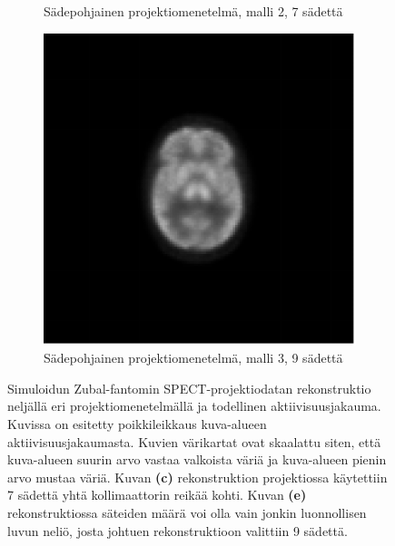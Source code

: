 \begin{figure}[H]
\begin{subfigure}[b]{.25\textwidth}
        \caption{Sädepohjainen projektiomenetelmä, malli 2, 7 sädettä}
    \end{subfigure}%
    \hspace{.075\textwidth}%
    \begin{subfigure}[b]{.25\textwidth}
        \includegraphics[width=\linewidth]{kuvat/cbf_rekonstruktio_proj1_malli3_nRay9.pdf}
        \caption{Sädepohjainen projektiomenetelmä, malli 3, 9 sädettä}
    \end{subfigure}
    \caption{Simuloidun Zubal-fantomin SPECT-projektiodatan rekonstruktio neljällä eri projektiomenetelmällä ja todellinen aktiivisuusjakauma. Kuvissa on esitetty poikkileikkaus kuva-alueen aktiivisuusjakaumasta. Kuvien värikartat ovat skaalattu siten, että kuva-alueen suurin arvo vastaa valkoista väriä ja kuva-alueen pienin arvo mustaa väriä. Kuvan \textbf{(c)} rekonstruktion projektiossa käytettiin 7 sädettä yhtä kollimaattorin reikää kohti. Kuvan \textbf{(e)} rekonstruktiossa säteiden määrä voi olla vain jonkin luonnollisen luvun neliö, josta johtuen rekonstruktioon valittiin 9 sädettä.}
    \label{fig:cbf-rekonstruktiot}
\end{figure}

